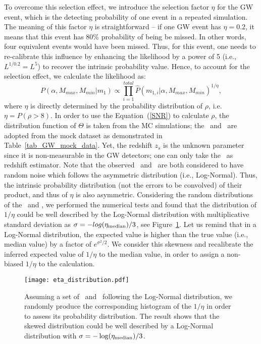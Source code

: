 \documentclass[twocolumn]{aastex62}
\begin{document}
To overcome this selection effect, we introduce the selection factor $\eta$ for the GW event, which is the detecting probability of one event in a repeated simulation. 
The meaning of this factor $\eta$ is straightforward -- if one GW event has $\eta=0.2$, it means that this event has 80\% probability of being be missed. In other words, four equivalent events would have been missed. Thus, for this event, one needs to re-calibrate this influence by enhancing the likelihood by a power of 5 (i.e., $L^{1/0.2} = L^5$) to recover the intrinsic probability value. Hence, to account for the selection effect, we calculate the likelihood as:
 \begin{equation} \label{equ_lik_sf}
 P(\alpha, M_{max}, M_{min}|m_{1}) \propto  \prod_{i=1}^{total} \hat{P}(m_{1,i}|\alpha, M_{max}, M_{min})^{1/\eta},
 \end{equation}
where $\eta$ is directly determined by the probability distribution of $\rho$, i.e. $\eta = P(\rho>8)$. In order to use the Equation~(\ref{SNR}) to calculate $\rho$, the distribution function of $\Theta$ is taken from the MC simulations; the \cmass\ and \dl\ are adopted from the mock dataset as demonstrated in Table~\ref{tab_GW_mock_data}. Yet, the redshift $z_s$ is the unknown parameter since it is non-measurable in the GW detectors; one can only take the \dl\ as redshift estimator.
Note that the observed \dl\ and \cmass\ are both considered to have random noise which follows the asymmetric distribution (i.e., Log-Normal). Thus, the intrinsic probability distribution (not the errors to be convolved) of their product, and thus of $\eta$ is also asymmetric. Considering the random distributions of the \dl\ and \cmass, we performed the numerical tests and found that the distribution of $1/\eta$ could be well described by the Log-Normal distribution with multiplicative standard deviation as $\sigma=-log(\eta_{\rm median})/3$, see Figure~\ref{fig_eta}. Let us remind that in a Log-Normal distribution, the expected value is higher than the true value (i.e., median value) by a factor of $e^{\sigma^2/2}$.
We consider this skewness and recalibrate the inferred expected value of $1/\eta$ to the median value, in order to assign a non-biased $1/\eta$ to the calculation.

\begin{figure}%
\texttt{[image: eta\_distribution.pdf]}
\caption{
Assuming a set of \dl\ and \cmass\ following the Log-Normal distribution, we randomly produce the corresponding histogram of the $1/\eta$ in order to assess its probability distribution. The result shows that the skewed distribution could be well described by a Log-Normal distribution with $\sigma = -\log(\eta_{\rm median})/3$.
}
\label{fig_eta}
\end{figure}
\end{document}
